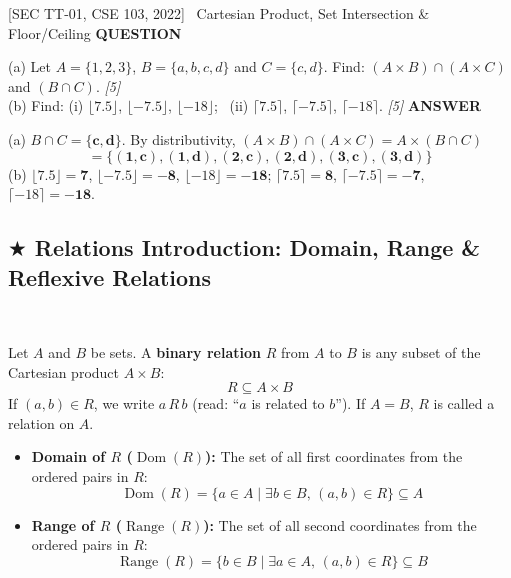 \documentclass[11pt,a4paper]{article}
\newcommand{\Qlabel}{\textbf{\color{navy}\footnotesize\MakeUppercase{Question}}\par\smallskip}
\newcommand{\Alabel}{\textbf{\color{teal}\footnotesize\MakeUppercase{Answer}}\par\smallskip}
\begin{document}
\begin{exambox}{[SEC TT-01, CSE 103, 2022] \ Cartesian Product, Set Intersection \& Floor/Ceiling}
\Qlabel
(a) Let $A = \{1, 2, 3\}$, $B = \{a, b, c, d\}$ and $C = \{c, d\}$. Find: $(A \times B) \cap (A \times C)$ and $(B \cap C)$. \hfill\textit{[5]}\\
(b) Find: (i) $\lfloor 7.5 \rfloor$, $\lfloor -7.5 \rfloor$, $\lfloor -18 \rfloor$; \ (ii) $\lceil 7.5 \rceil$, $\lceil -7.5 \rceil$, $\lceil -18 \rceil$. \hfill\textit{[5]}
\tcblower
\Alabel
(a) $B \cap C = \mathbf{\{c, d\}}$. By distributivity, $(A \times B) \cap (A \times C) = A \times (B \cap C)$
\[
\mathbf{= \{(1, c), (1, d), (2, c), (2, d), (3, c), (3, d)\}}
\]
(b) $\lfloor 7.5 \rfloor = \mathbf{7}$, $\lfloor -7.5 \rfloor = \mathbf{-8}$, $\lfloor -18 \rfloor = \mathbf{-18}$; \quad $\lceil 7.5 \rceil = \mathbf{8}$, $\lceil -7.5 \rceil = \mathbf{-7}$, $\lceil -18 \rceil = \mathbf{-18}$.
\end{exambox}

\newpage
\subsection{\texorpdfstring{$\bigstar$ }{*}Relations Introduction: Domain, Range \& Reflexive Relations}
\\[4pt]

\begin{defbox}
Let $A$ and $B$ be sets. A \textbf{binary relation} $R$ from $A$ to $B$ is any subset of the Cartesian product $A \times B$:
\[
R \subseteq A \times B
\]
If $(a, b) \in R$, we write $a \, R \, b$ (read: ``$a$ is related to $b$''). If $A = B$, $R$ is called a relation on $A$.
\begin{itemize}
    \item \textbf{Domain of $R$ ($\operatorname{Dom}(R)$):} The set of all first coordinates from the ordered pairs in $R$:
    \[
    \operatorname{Dom}(R) = \{ a \in A \mid \exists b \in B, \, (a, b) \in R \} \subseteq A
    \]
    \item \textbf{Range of $R$ ($\operatorname{Range}(R)$):} The set of all second coordinates from the ordered pairs in $R$:
    \[
    \operatorname{Range}(R) = \{ b \in B \mid \exists a \in A, \, (a, b) \in R \} \subseteq B
    \]
\end{itemize}
\end{defbox}
\end{document}
